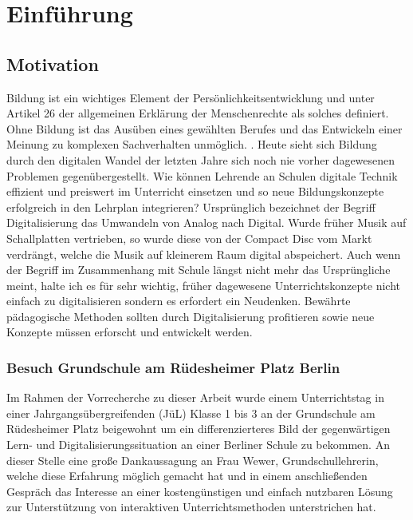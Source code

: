 \section{Einführung}\label{sec:einfuhrung}
\subsection{Motivation}\label{sec:motivation}

Bildung ist ein wichtiges Element der Persönlichkeitsentwicklung und unter Artikel 26 der allgemeinen Erklärung der Menschenrechte als solches definiert. Ohne Bildung ist das Ausüben eines gewählten Berufes und das Entwickeln einer Meinung zu komplexen Sachverhalten unmöglich. \cite{weitblicker.org2019:online}. Heute sieht sich Bildung durch den digitalen Wandel der letzten Jahre sich noch nie vorher dagewesenen Problemen gegenübergestellt. Wie können Lehrende an Schulen digitale Technik effizient und preiswert im Unterricht einsetzen und so neue Bildungskonzepte erfolgreich in den Lehrplan integrieren? Ursprünglich bezeichnet der Begriff Digitalisierung das Umwandeln von Analog nach Digital. Wurde früher Musik auf Schallplatten vertrieben, so wurde diese von der Compact Disc vom Markt verdrängt, welche die Musik auf kleinerem Raum digital abspeichert. Auch wenn der Begriff im Zusammenhang mit Schule längst nicht mehr das Ursprüngliche meint, halte ich es für sehr wichtig, früher dagewesene Unterrichtskonzepte nicht einfach zu digitalisieren sondern es erfordert ein Neudenken. Bewährte pädagogische Methoden sollten durch Digitalisierung profitieren sowie neue Konzepte müssen erforscht und entwickelt werden. 

\subsubsection{Besuch Grundschule am Rüdesheimer Platz Berlin}\label{sec:grundschulebesuch}
Im Rahmen der Vorrecherche zu dieser Arbeit wurde einem Unterrichtstag in 
einer Jahrgangsübergreifenden (JüL) Klasse 1 bis 3 an der Grundschule am Rüdesheimer Platz beigewohnt um ein differenzierteres 
Bild der gegenwärtigen Lern- und Digitalisierungssituation an einer Berliner Schule zu bekommen. An dieser Stelle eine große Dankaussagung an Frau Wewer, Grundschullehrerin, welche diese Erfahrung möglich gemacht hat und in einem anschließenden Gespräch das Interesse an einer kostengünstigen und einfach nutzbaren Lösung zur Unterstützung von interaktiven Unterrichtsmethoden unterstrichen hat.
\newpage
